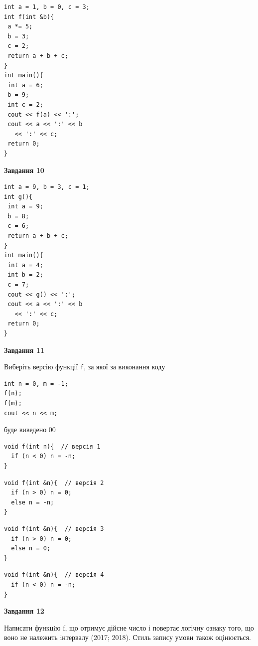 \documentclass[12pt, ukrainian]{article}
\def\code#1{\Verb!#1!}
\begin{document}
{\begin {large}
\begin{minipage}[t]{7.0cm}
\begin{verbatim}
int a = 1, b = 0, c = 3;
int f(int &b){
 a *= 5;
 b = 3;
 c = 2;
 return a + b + c;
}
int main(){
 int a = 6;
 b = 9;
 int c = 2;
 cout << f(a) << ':';
 cout << a << ':' << b 
   << ':' << c;
 return 0;
}
\end{verbatim}



\begin{center}
\textbf{Завдання 10}
\end{center}
\vspace{-8mm}

\begin{verbatim}
int a = 9, b = 3, c = 1;
int g(){
 int a = 9;
 b = 8;
 c = 6;
 return a + b + c;
}
int main(){
 int a = 4;
 int b = 2;
 c = 7;
 cout << g() << ':';
 cout << a << ':' << b 
   << ':' << c;
 return 0;
}
\end{verbatim}

\end{minipage}
\vline \hspace{1mm}
\begin{minipage}[t]{11.0cm}

\begin{center}
\textbf{Завдання 11}
\end{center}
Виберіть версію функції \code{f}, за якої за виконання коду
\begin{verbatim}
int n = 0, m = -1;
f(n);
f(m);
cout << n << m;
\end{verbatim}

буде виведено 00

\begin{verbatim}
void f(int n){  // версія 1
  if (n < 0) n = -n;
}
\end{verbatim}

\vspace{-8mm}\begin{verbatim}
void f(int &n){  // версія 2
  if (n > 0) n = 0;
  else n = -n;
}
\end{verbatim}

\vspace{-8mm}\begin{verbatim}
void f(int &n){  // версія 3
  if (n > 0) n = 0;
  else n = 0;
}
\end{verbatim}

\vspace{-8mm}\begin{verbatim}
void f(int &n){  // версія 4
  if (n < 0) n = -n;
}
\end{verbatim}



\begin{center}
\textbf{Завдання 12}
\end{center}

Написати функцiю f, що отримує дійсне число і повертає логічну ознаку того, що воно не належить iнтервалу (2017; 2018). Стиль запису умови також оцінюється.\par

\end{minipage}

\end {large}}
\newpage
\end{document}

